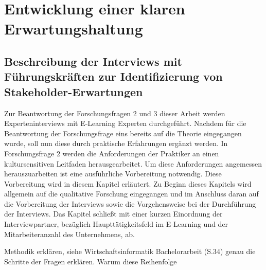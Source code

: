 \chapter{Entwicklung einer klaren Erwartungshaltung}
\label{chap:erwartungshaltung}

\section{Beschreibung der Interviews mit Führungskräften zur Identifizierung von Stakeholder-Erwartungen}
\label{sec:beschreibung-der-interviews}

Zur Beantwortung der Forschungsfragen 2 und 3 dieser Arbeit werden
Experteninterviews mit E-Learning Experten durchgeführt. Nachdem für die
Beantwortung der Forschungsfrage eins bereits auf die Theorie eingegangen wurde, soll
nun diese durch praktische Erfahrungen ergänzt werden. In Forschungsfrage 2 werden
die Anforderungen der Praktiker an einen kultursensitiven Leitfaden herausgearbeitet.
Um diese Anforderungen angemessen herauszuarbeiten ist eine ausführliche
Vorbereitung notwendig. Diese Vorbereitung wird in diesem Kapitel erläutert. Zu
Beginn dieses Kapitels wird allgemein auf die qualitative Forschung eingegangen und
im Anschluss daran auf die Vorbereitung der Interviews sowie die Vorgehensweise bei
der Durchführung der Interviews. Das Kapitel schließt mit einer kurzen Einordnung der
Interviewpartner, bezüglich Haupttätigkeitsfeld im E-Learning und der
Mitarbeiteranzahl des Unternehmens, ab. 


Methodik erklären, siehe Wirtschaftsinformatik Bachelorarbeit (S.34)
genau die Schritte der Fragen erklären. Warum diese Reihenfolge


